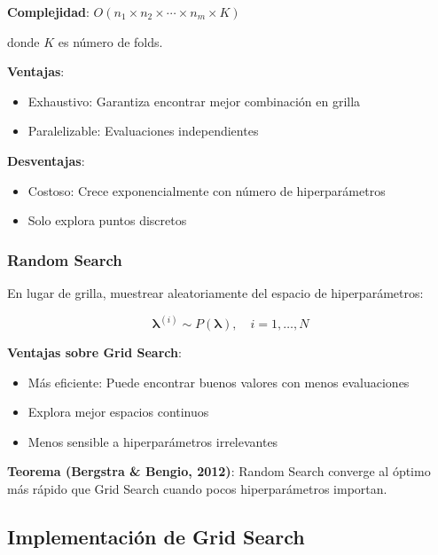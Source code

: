 \documentclass[
  doc,
  floatsintext,
  longtable,
  a4paper,
  nolmodern,
  notxfonts,
  notimes,
  12pt,
  colorlinks=true,linkcolor=blue,citecolor=blue,urlcolor=blue]{apa7}
\providecommand{\tightlist}{%
  \setlength{\itemsep}{0pt}\setlength{\parskip}{0pt}}
\begin{document}
\textbf{Complejidad}:
\(O(n_1 \times n_2 \times \cdots \times n_m \times K)\)

donde \(K\) es número de folds.

\textbf{Ventajas}:

\begin{itemize}
\tightlist
\item
  Exhaustivo: Garantiza encontrar mejor combinación en grilla
\item
  Paralelizable: Evaluaciones independientes
\end{itemize}

\textbf{Desventajas}:

\begin{itemize}
\tightlist
\item
  Costoso: Crece exponencialmente con número de hiperparámetros
\item
  Solo explora puntos discretos
\end{itemize}

\subsubsection{Random Search}\label{random-search}

En lugar de grilla, muestrear aleatoriamente del espacio de
hiperparámetros:

\[
\boldsymbol{\lambda}^{(i)} \sim P(\boldsymbol{\lambda}), \quad i = 1, \ldots, N
\]

\textbf{Ventajas sobre Grid Search}:

\begin{itemize}
\tightlist
\item
  Más eficiente: Puede encontrar buenos valores con menos evaluaciones
\item
  Explora mejor espacios continuos
\item
  Menos sensible a hiperparámetros irrelevantes
\end{itemize}

\textbf{Teorema (Bergstra \& Bengio, 2012)}: Random Search converge al
óptimo más rápido que Grid Search cuando pocos hiperparámetros importan.

\subsection{Implementación de Grid
Search}\label{implementaciuxf3n-de-grid-search}
\end{document}
